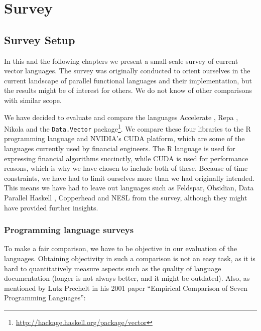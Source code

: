 \part{Survey}
\chapter{Survey Setup}
In this and the following chapters we present a small-scale survey of
current vector languages. The survey was originally conducted to
orient ourselves in the current landscape of parallel functional
languages and their implementation, but the results might be of
interest for others. We do not know of other comparisons with similar
scope.

We have decided to evaluate and compare the languages Accelerate
\cite{chakravarty2011accelerating}, Repa \cite{keller2010regular},
Nikola \cite{mainland2010nikola} and the \texttt{Data.Vector}
package\footnote{\url{http://hackage.haskell.org/package/vector}}. We
compare these four libraries to the R programming language and NVIDIA's
CUDA platform, which are some of the languages currently used by
financial engineers. The R language is used for expressing financial
algorithms succinctly, while CUDA is used for performance reasons,
which is why we have chosen to include both of these. Because of time
constraints, we have had to limit ourselves more than we had originally
intended. This means we have had to leave out languages such as
Feldspar\cite{axelsson2010feldspar},
Obsidian\cite{svensson2011obsidian}, Data Parallel Haskell \cite{},
Copperhead\cite{Catanzaro2011} and NESL\cite{nesl} from the survey,
although they might have provided further insights.


\todo{}

\section{Programming language surveys}
To make a fair comparison, we have to be objective in our evaluation
of the languages. Obtaining objectivity in such a comparison is not
an easy task, as it is hard to quantitatively measure aspects such as
the quality of language documentation (longer is not always better,
and it might be outdated). Also, as mentioned by Lutz Prechelt in his
2001 paper ``Empirical Comparison of Seven Programming Languages'':

